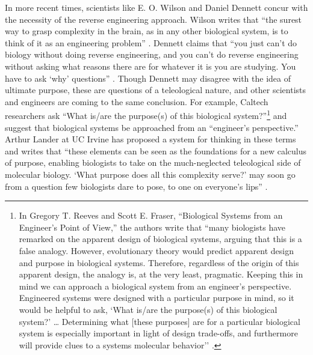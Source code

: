 In more recent times, scientists like E. O. Wilson and Daniel Dennett
concur with the necessity of the reverse engineering approach. Wilson
writes that “the surest way to grasp complexity in the brain, as in any
other biological system, is to think of it as an engineering
problem” \citep[][p.~112]{wilson1998}. Dennett claims that ``you just can’t do
biology without doing reverse engineering, and you can’t do reverse
engineering without asking what reasons there are for whatever it is
you are studying. You have to ask `why' questions'' \citep[][p.~213]{dennett1996}.
Though Dennett may disagree with the idea of ultimate purpose, these
are questions of a teleological nature, and other scientists and
engineers are coming to the same conclusion. For example, Caltech
researchers ask “What is/are the purpose(s) of this biological
system?”\footnote{%
In Gregory T. Reeves and Scott E. Fraser,
“Biological Systems from an Engineer’s Point of View,” 
the authors write that ``many biologists have remarked on the apparent
design of biological systems, arguing that this is a false analogy.
However, evolutionary theory would predict apparent design and purpose
in biological systems. Therefore, regardless of the origin of this
apparent design, the analogy is, at the very least, pragmatic. Keeping
this in mind we can approach a biological system from an engineer’s
perspective. Engineered systems were designed with a particular purpose
in mind, so it would be helpful to ask, `What is/are the purpose(s) of
this biological system?' {\ldots} Determining what [these purposes] are for a
particular biological system is especially important in light of design
trade-offs, and furthermore will provide clues to a systems molecular
behavior'’ \citep{reevesfraser2009}.
} and suggest that biological systems be
approached from an “engineer’s perspective.” Arthur Lander at UC Irvine
has proposed a system for thinking in these terms and writes that
``these elements can be seen as the foundations for a new calculus of
purpose, enabling biologists to take on the much-neglected teleological
side of molecular biology. `What purpose does all this complexity
serve?' may soon go from a question few biologists dare to pose, to one
on everyone’s lips'' \citep{lander2004}.

